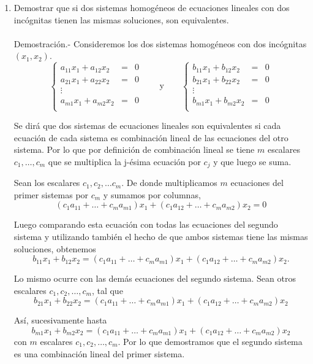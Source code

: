 \begin{enumerate}[\bfseries 1.]
    \item Demostrar que si dos sistemas homogéneos de ecuaciones lineales con dos incógnitas tienen las mismas soluciones, son equivalentes.\\\\
	Demostración.-\; Consideremos los dos sistemas homogéneos con dos incógnitas $(x_1,x_2)$.
	$$\left\{\begin{array}{ccc}
		a_{11} x_1 + a_{12} x_2 &=& 0\\
		a_{21} x_1 + a_{22} x_2 &=& 0\\
		\vdots\\
		a_{m1} x_1 + a_{m2} x_2 &=& 0\\
	\end{array}\right. \qquad \mbox{y} \qquad 
	\left\{\begin{array}{ccc}
		b_{11} x_1 + b_{12} x_2 &=& 0\\
		b_{21} x_1 + b_{22} x_2 &=& 0\\
		\vdots\\
		b_{m1} x_1 + b_{m2} x_2 &=& 0\\
	\end{array}\right.$$

	Se dirá que dos sistemas de ecuaciones lineales son equivalentes si cada ecuación de cada sistema es combinación lineal de las ecuaciones del otro sistema. Por lo que por definición de combinación lineal se tiene $m$ escalares $c_1,\ldots,c_m$ que se multiplica la j-ésima ecuación por $c_j$ y que luego se suma. 

	Sean los escalares $c_1,c_2,\ldots c_m$. De donde multiplicamos $m$ ecuaciones del primer sistemas por $c_m$ y sumamos por columnas,
	$$\left(c_1a_{11}+\ldots + c_m a_{m1}\right)x_1 + \left(c_1 a_{12}+\ldots + c_m a_{m2}\right)x_2=0$$

	Luego comparando esta ecuación con todas las ecuaciones del segundo sistema y utilizando también el hecho de que ambos sistemas tiene las mismas soluciones, obtenemos
	$$b_{11}x_1+b_{12}x_2=\left(c_1a_{11}+\ldots + c_m a_{m1}\right)x_1 + \left(c_1 a_{12}+\ldots + c_m a_{m2}\right)x_2.$$

	Lo mismo ocurre con las demás ecuaciones del segundo sistema. Sean otros escalares $c_1,c_2,\ldots, c_m$, tal que  
	$$b_{21}x_1+b_{22}x_2=\left(c_1a_{11}+\ldots + c_m a_{m1}\right)x_1 + \left(c_1 a_{12}+\ldots + c_m a_{m2}\right)x_2$$

	Así, sucesivamente hasta 
	$$b_{m1}x_1+b_{m2}x_2=\left(c_1a_{11}+\ldots + c_m a_{m1}\right)x_1 + \left(c_1 a_{12}+\ldots + c_m a_{m2}\right)x_2$$
	con $m$ escalares $c_1,c_2,\ldots, c_m$. Por lo que demostramos que el segundo sistema es una combinación lineal del primer sistema.\\


\end{enumerate}
